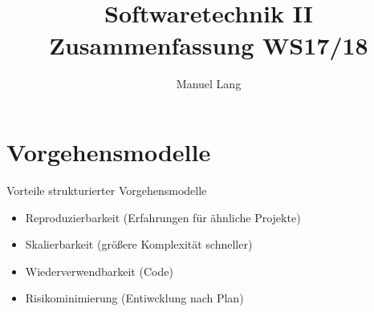 \documentclass[paper=a4, fontsize=11pt]{scrartcl} %
\title{
\normalfont \normalsize
\horrule{0.5pt} \\[0.4cm] %
\huge Softwaretechnik II\\ Zusammenfassung WS17/18 %
\horrule{2pt} \\[0.5cm] %
}
\author{Manuel Lang} %
\date{} %
\numberwithin{equation}{section} %
\numberwithin{figure}{section} %
\numberwithin{table}{section} %
\begin{document}
\maketitle %
\tableofcontents
\newpage

\section{Vorgehensmodelle}

Vorteile strukturierter Vorgehensmodelle
\begin{itemize}
  \item Reproduzierbarkeit (Erfahrungen für ähnliche Projekte)
  \item Skalierbarkeit (größere Komplexität schneller)
  \item Wiederverwendbarkeit (Code)
  \item Risikominimierung (Entiwcklung nach Plan)
\end{itemize}
\end{document}
